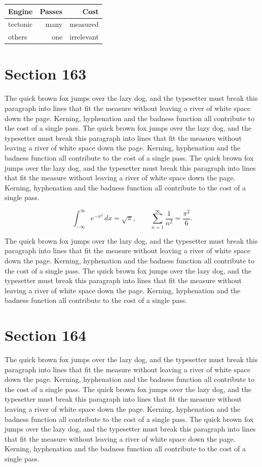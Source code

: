 \documentclass{article}
\begin{document}
\begin{center}
\begin{tabular}{lrr}
\toprule
Engine & Passes & Cost \\
\midrule
tectonic & many & measured \\
others & one & irrelevant \\
\bottomrule
\end{tabular}
\end{center}

\section{Section 163}
The quick brown fox jumps over the lazy dog, and the typesetter must break this paragraph into lines that fit the measure without leaving a river of white space down the page. Kerning, hyphenation and the badness function all contribute to the cost of a single pass. The quick brown fox jumps over the lazy dog, and the typesetter must break this paragraph into lines that fit the measure without leaving a river of white space down the page. Kerning, hyphenation and the badness function all contribute to the cost of a single pass. The quick brown fox jumps over the lazy dog, and the typesetter must break this paragraph into lines that fit the measure without leaving a river of white space down the page. Kerning, hyphenation and the badness function all contribute to the cost of a single pass. 

\begin{equation}
\int_{-\infty}^{\infty} e^{-x^{2}}\,dx = \sqrt{\pi}, \qquad
\sum_{n=1}^{\infty} \frac{1}{n^{2}} = \frac{\pi^{2}}{6}.
\end{equation}

The quick brown fox jumps over the lazy dog, and the typesetter must break this paragraph into lines that fit the measure without leaving a river of white space down the page. Kerning, hyphenation and the badness function all contribute to the cost of a single pass. The quick brown fox jumps over the lazy dog, and the typesetter must break this paragraph into lines that fit the measure without leaving a river of white space down the page. Kerning, hyphenation and the badness function all contribute to the cost of a single pass. 
\section{Section 164}
The quick brown fox jumps over the lazy dog, and the typesetter must break this paragraph into lines that fit the measure without leaving a river of white space down the page. Kerning, hyphenation and the badness function all contribute to the cost of a single pass. The quick brown fox jumps over the lazy dog, and the typesetter must break this paragraph into lines that fit the measure without leaving a river of white space down the page. Kerning, hyphenation and the badness function all contribute to the cost of a single pass. The quick brown fox jumps over the lazy dog, and the typesetter must break this paragraph into lines that fit the measure without leaving a river of white space down the page. Kerning, hyphenation and the badness function all contribute to the cost of a single pass. 
\end{document}

